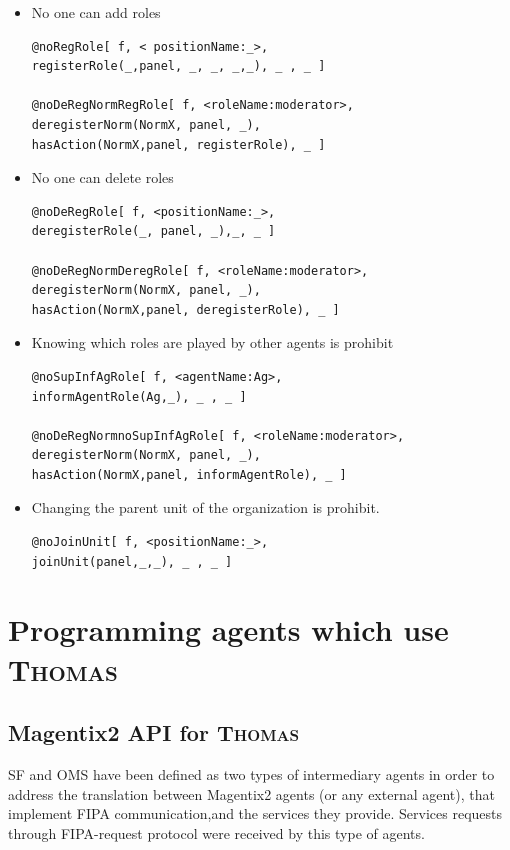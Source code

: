 \begin{itemize}
\begin{itemize}
\item No one can add roles
\begin{verbatim}
@noRegRole[ f, < positionName:_>, 
registerRole(_,panel, _, _, _,_), _ , _ ] 

@noDeRegNormRegRole[ f, <roleName:moderator>, 
deregisterNorm(NormX, panel, _),
hasAction(NormX,panel, registerRole), _ ] 
\end{verbatim}


\item No one can delete roles
\begin{verbatim}
@noDeRegRole[ f, <positionName:_>, 
deregisterRole(_, panel, _),_, _ ] 

@noDeRegNormDeregRole[ f, <roleName:moderator>, 
deregisterNorm(NormX, panel, _),
hasAction(NormX,panel, deregisterRole), _ ] 
\end{verbatim}

\item Knowing which roles are played by other agents is prohibit
\begin{verbatim}
@noSupInfAgRole[ f, <agentName:Ag>,
informAgentRole(Ag,_), _ , _ ] 

@noDeRegNormnoSupInfAgRole[ f, <roleName:moderator>,
deregisterNorm(NormX, panel, _),
hasAction(NormX,panel, informAgentRole), _ ] 

\end{verbatim}

\item Changing the parent unit of the organization is prohibit.   
\begin{verbatim}
@noJoinUnit[ f, <positionName:_>, 
joinUnit(panel,_,_), _ , _ ] 
\end{verbatim}

\end{itemize}

\end{itemize}



\section{Programming agents which use \textsc{Thomas}}\label{sec:programmingAgentsThomas}

\subsection{Magentix2 API for \textsc{Thomas}}\label{thomasAPI}
SF and OMS have been defined as two types of intermediary agents in order to address the translation between Magentix2 agents (or any external agent), that implement FIPA communication,and the services they provide. Services requests through FIPA-request protocol were received by this type of agents.

